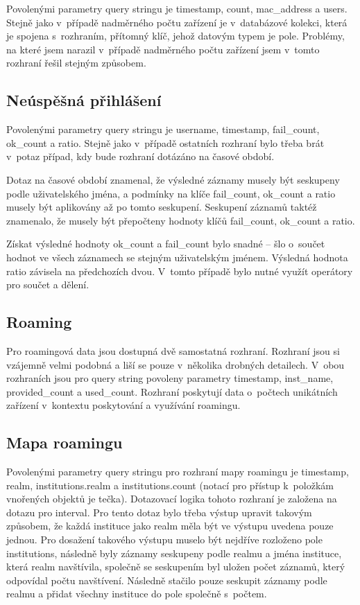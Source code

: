 \documentclass[thesis=M,czech]{FITthesis}[2012/06/26]
\begin{document}
      Povolenými parametry query stringu je timestamp, count, mac\_address a users.
      Stejně jako v~případě nadměrného počtu zařízení je 
      v~databázové kolekci, která je spojena s~rozhraním, přítomný klíč, jehož datovým typem je pole.
      Problémy, na které jsem narazil v~případě nadměrného počtu zařízení jsem v~tomto rozhraní řešil stejným způsobem.

    \subsection{Neúspěšná přihlášení}
      
      Povolenými parametry query stringu je username, timestamp, fail\_count, ok\_count a ratio.
      Stejně jako v~případě ostatních rozhraní bylo třeba brát v~potaz případ, 
      kdy bude rozhraní dotázáno na časové období.

      Dotaz na časové období znamenal, že výsledné záznamy musely být seskupeny podle uživatelského jména,
      a podmínky na klíče fail\_count, ok\_count a ratio musely být aplikovány až po tomto seskupení.
      Seskupení záznamů taktéž znamenalo, že musely být přepočteny hodnoty klíčů fail\_count, ok\_count a ratio.

      Získat výsledné hodnoty ok\_count a fail\_count bylo snadné -- šlo o~součet hodnot ve všech záznamech
      se stejným uživatelským jménem.
      Výsledná hodnota ratio závisela na předchozích dvou. 
      V~tomto případě bylo nutné využít operátory pro součet a dělení.

    \subsection{Roaming}

      Pro roamingová data jsou dostupná dvě samostatná rozhraní.
      Rozhraní jsou si vzájemně velmi podobná a liší se pouze v~několika drobných detailech.
      V~obou rozhraních jsou pro query string povoleny parametry timestamp, inst\_name, provided\_count a used\_count.
      Rozhraní poskytují data o~počtech unikátních zařízení v~kontextu poskytování a využívání roamingu.

    \subsection{Mapa roamingu}

      Povolenými parametry query stringu pro rozhraní mapy roamingu je timestamp, realm, institutions.realm a institutions.count
      (notací pro přístup k~položkám vnořených objektů je tečka).
      Dotazovací logika tohoto rozhraní je založena na dotazu pro interval.
      Pro tento dotaz bylo třeba výstup upravit takovým způsobem,
      že každá instituce jako realm měla být ve výstupu uvedena pouze jednou.
      Pro dosažení takového výstupu muselo být nejdříve rozloženo pole institutions,
      následně byly záznamy seskupeny podle realmu a jména instituce, která realm navštívila, 
      společně se seskupením byl uložen počet záznamů, který odpovídal počtu navštívení.
      Následně stačilo pouze seskupit záznamy podle realmu a přidat všechny instituce do pole společně s~počtem.
\end{document}
